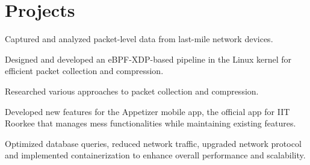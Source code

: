 \documentclass[letterpaper]{deedy-resume} %
\begin{document}
\begin{minipage}[t]{0.66\textwidth}
\sectionspace %


\section{Projects} 

\begin{tightitemize}
\item Captured and analyzed packet-level data from last-mile network devices.
\item Designed and developed an eBPF-XDP-based pipeline in the Linux kernel for efficient packet collection and compression.
\item Researched various approaches to packet collection and compression.
\end{tightitemize}

\begin{tightitemize}
\item Developed new features for the Appetizer mobile app, the official app for IIT Roorkee that manages mess functionalities while maintaining existing features.
\item Optimized database queries, reduced network traffic, upgraded network protocol and implemented containerization to enhance overall performance and scalability.
\end{tightitemize}
\sectionspace %




\end{minipage}
\end{document}
